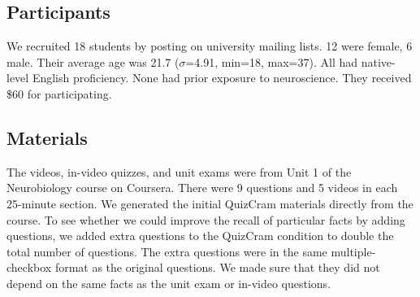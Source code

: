 \documentclass{sigchi}
\begin{document}


\subsection{Participants}

We recruited 18  students by posting on university mailing lists. 12 were female, 6 male. Their average age was 21.7 ($\sigma$=4.91, min=18, max=37). All had native-level English proficiency. None had prior exposure to neuroscience.  They received \$60 for participating. %

\subsection{Materials}



The videos, in-video quizzes, and unit exams were from Unit 1 of the Neurobiology course on Coursera. There were 9 questions and 5 videos in each 25-minute section. We generated the initial QuizCram materials directly from the course. To see whether we could improve the recall of particular facts by adding questions, we added extra questions to the QuizCram condition to double the total number of questions. The extra questions were in the same multiple-checkbox format as the original questions. We made sure that they did not depend on the same facts as the unit exam or in-video questions.
\end{document}
